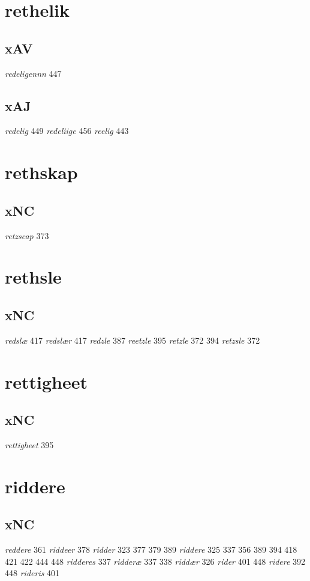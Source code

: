 \documentclass[a4paper,twocolumn]{article}
\begin{document}
\section{rethelik}
\label{sec:orgf8c1312}
\subsection{xAV}
\label{sec:orgbadfadb}
\emph{redeligennn} 447 
\subsection{xAJ}
\label{sec:orgc8a38b1}
\emph{redelig} 449 \emph{redeliige} 456 \emph{reelig} 443 
\section{rethskap}
\label{sec:org85a1be1}
\subsection{xNC}
\label{sec:org2ab66f4}
\emph{retzscap} 373 
\section{rethsle}
\label{sec:org9dc8fa8}
\subsection{xNC}
\label{sec:org8d80c9e}
\emph{redslæ} 417 \emph{redslær} 417 \emph{redzle} 387 \emph{reetzle} 395 \emph{retzle} 372 394 \emph{retzsle} 372 
\section{rettigheet}
\label{sec:org56b296a}
\subsection{xNC}
\label{sec:orgeaeec8a}
\emph{rettigheet} 395 
\section{riddere}
\label{sec:orge2bd61f}
\subsection{xNC}
\label{sec:orgbb7fe6c}
\emph{reddere} 361 \emph{riddeer} 378 \emph{ridder} 323 377 379 389 \emph{riddere} 325 337 356 389 394 418 421 422 444 448 \emph{ridderes} 337 \emph{ridderæ} 337 338 \emph{riddær} 326 \emph{rider} 401 448 \emph{ridere} 392 448 \emph{rideris} 401 
\end{document}
